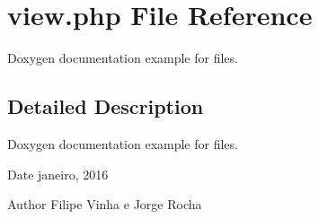\hypertarget{view_8php}{}\section{view.\+php File Reference}
\label{view_8php}


Doxygen documentation example for files.  




\subsection{Detailed Description}
Doxygen documentation example for files. 

\begin{DoxyDate}{Date}
janeiro, 2016 
\end{DoxyDate}
\begin{DoxyAuthor}{Author}
Filipe Vinha e Jorge Rocha 
\end{DoxyAuthor}

